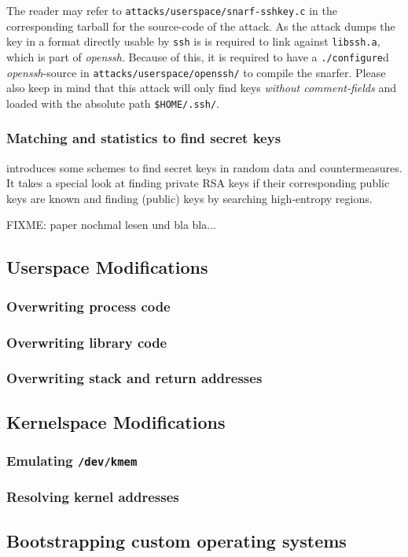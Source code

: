 The reader may refer to \texttt{attacks/userspace/snarf-sshkey.c} in the
corresponding tarball for the source-code of the attack. As the attack dumps the
key in a format directly usable by \texttt{ssh} is is required to link against
\texttt{libssh.a}, which is part of \emph{openssh}. Because of this, it is
required to have a \texttt{./configure}d \emph{openssh}-source in
\texttt{attacks/userspace/openssh/} to compile the snarfer. Please also keep in
mind that this attack will only find keys \emph{without comment-fields} and
loaded with the absolute path \texttt{\$HOME/.ssh/}.

\subsubsection{Matching and statistics to find secret keys}

\cite{hide_n_seek:1998} introduces some schemes to find secret keys in random
data and countermeasures. It takes a special look at finding private RSA keys if
their corresponding public keys are known and finding (public) keys by searching
high-entropy regions.

FIXME: paper nochmal lesen und bla bla...

\subsection{Userspace Modifications}

\subsubsection{Overwriting process code}

\subsubsection{Overwriting library code}

\subsubsection{Overwriting stack and return addresses}




\subsection{Kernelspace Modifications}

\subsubsection{Emulating \texttt{/dev/kmem}}

\subsubsection{Resolving kernel addresses}





\subsection{Bootstrapping custom operating systems}




